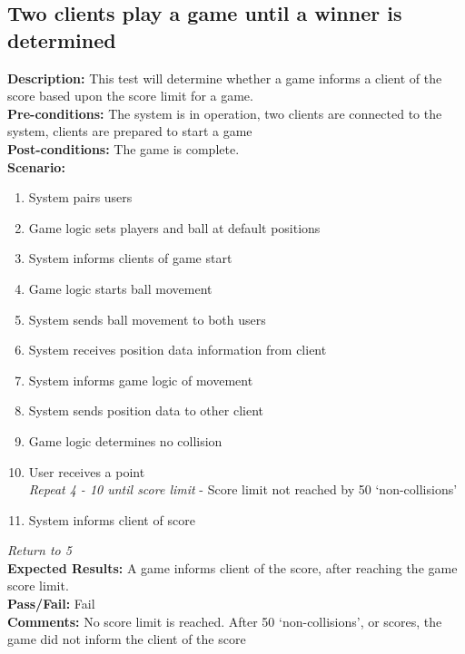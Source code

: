 \documentclass[12pt]{article}
\begin{document}
    \subsection{Two clients play a game until a winner is determined}
    \textbf{Description:} This test will determine whether a game informs a client of the score based upon the score limit for a game.\\
    \textbf{Pre-conditions:} The system is in operation, two clients are connected to the system, clients are prepared to start a game\\
    \textbf{Post-conditions:} The game is complete.\\
    \textbf{Scenario:}
    \begin{enumerate}
        \item System pairs users
        \item Game logic sets players and ball at default positions
        \item System informs clients of game start
        \item Game logic starts ball movement
        \item System sends ball movement to both users
        \item System receives position data information from client
        \item System informs game logic of movement
        \item System sends position data to other client
        \item Game logic determines no collision
        \item User receives a point\\
        \emph{Repeat 4 - 10 until score limit} - Score limit not reached by 50 ‘non-collisions’
        \item System informs client of score
    \end{enumerate}
    \emph{Return to 5}\\
    \textbf{Expected Results:} A game informs client of the score, after reaching the game score limit.\\
    \textbf{Pass/Fail:} Fail\\
    \textbf{Comments:} No score limit is reached. After 50 ‘non-collisions’, or scores, the game did not inform the client of the score\\
\end{document}
